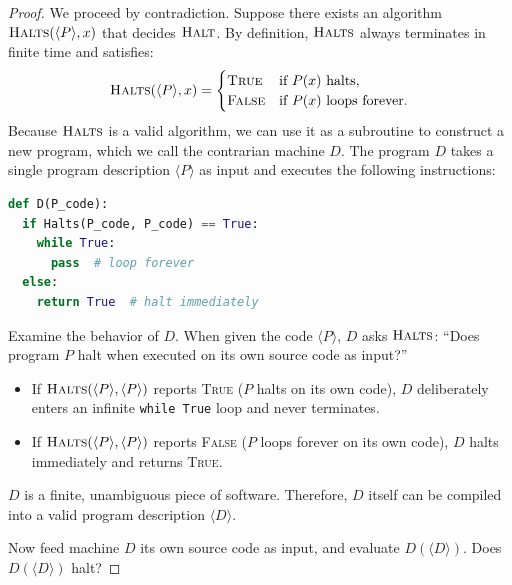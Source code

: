 \begin{proof}
We proceed by contradiction. Suppose there exists an algorithm $\textsc{Halts}(\langle P \rangle, x)$ that decides $\textsc{Halt}$. By definition, $\textsc{Halts}$ always terminates in finite time and satisfies:
\[
  \textsc{Halts}(\langle P \rangle, x) =
  \begin{cases}
    \textsc{True}  & \text{if } P(x) \text{ halts}, \\
    \textsc{False} & \text{if } P(x) \text{ loops forever}.
  \end{cases}
\]
Because $\textsc{Halts}$ is a valid algorithm, we can use it as a subroutine to construct a new program, which we call the contrarian machine $D$. The program $D$ takes a single program description $\langle P \rangle$ as input and executes the following instructions:
\begin{lstlisting}[language=Python]
def D(P_code):
  if Halts(P_code, P_code) == True:
    while True:
      pass  # loop forever
  else:
    return True  # halt immediately
\end{lstlisting}
Examine the behavior of $D$. When given the code $\langle P \rangle$, $D$ asks $\textsc{Halts}$: ``Does program $P$ halt when executed on its own source code as input?''
\begin{itemize}
  \item If $\textsc{Halts}(\langle P \rangle, \langle P \rangle)$ reports \textsc{True} ($P$ halts on its own code), $D$ deliberately enters an infinite \lstinline|while True| loop and never terminates.
  \item If $\textsc{Halts}(\langle P \rangle, \langle P \rangle)$ reports \textsc{False} ($P$ loops forever on its own code), $D$ halts immediately and returns \textsc{True}.
\end{itemize}
$D$ is a finite, unambiguous piece of software. Therefore, $D$ itself can be compiled into a valid program description $\langle D \rangle$.

Now feed machine $D$ its own source code as input, and evaluate $D(\langle D \rangle)$. Does $D(\langle D \rangle)$ halt?


\end{proof}
